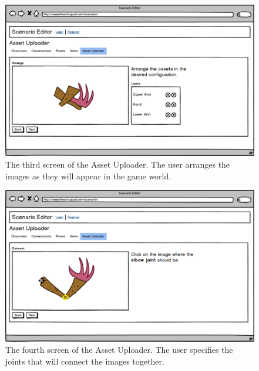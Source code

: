 \begin{figure}[p]
\centering\includegraphics[width=0.95\linewidth, height=0.7\paperheight, keepaspectratio=true]{images/AssetUploader_Arm3}
  \caption{The third screen of the Asset Uploader. The user arranges the images as they will appear in the game world.}
  \label{fig:mockup_asset_3}
\end{figure}

\begin{figure}[p]
\centering\includegraphics[width=0.95\linewidth, height=0.7\paperheight, keepaspectratio=true]{images/AssetUploader_Arm4}
  \caption{The fourth screen of the Asset Uploader. The user specifies the joints that will connect the images together.}
  \label{fig:mockup_asset_4}
\end{figure}

